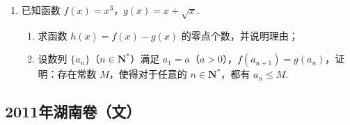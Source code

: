 \begin{description}
\begin{enumerate}[leftmargin=5pt]
        \item 已知函数 \(f(x) = x^3\)，\(g(x) = x + \sqrt{x}\).
\begin{enumerate}
\item 求函数 \( h(x) = f(x) - g(x) \) 的零点个数，并说明理由；
\item 设数列 \(\{a_{n}\}\)（\(n \in \mathbf{N}^{*}\)）满足 \(a_{1} = a\)（\(a > 0\)），\(f(a_{n+1}) = g(a_{n})\)，证明：存在常数 \(M\)，使得对于任意的 \(n \in \mathbf{N}^{*}\)，都有 \(a_{n} \leqslant M\).
\end{enumerate}

    \end{enumerate}

\end{description}


\subsection{2011年湖南卷（文）}\label{gk:2011年湖南卷（文）}

